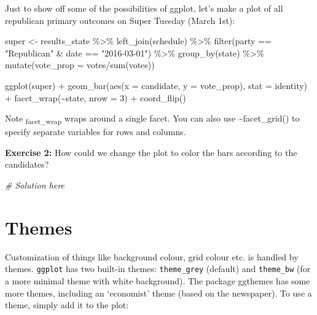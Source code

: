 \documentclass[
]{article}
\newenvironment{Shaded}{\begin{snugshade}}{\end{snugshade}}
\newcommand{\AttributeTok}[1]{\textcolor[rgb]{0.77,0.63,0.00}{#1}}
\newcommand{\CommentTok}[1]{\textcolor[rgb]{0.56,0.35,0.01}{\textit{#1}}}
\newcommand{\DecValTok}[1]{\textcolor[rgb]{0.00,0.00,0.81}{#1}}
\newcommand{\FunctionTok}[1]{\textcolor[rgb]{0.00,0.00,0.00}{#1}}
\newcommand{\NormalTok}[1]{#1}
\newcommand{\OtherTok}[1]{\textcolor[rgb]{0.56,0.35,0.01}{#1}}
\newcommand{\SpecialCharTok}[1]{\textcolor[rgb]{0.00,0.00,0.00}{#1}}
\newcommand{\StringTok}[1]{\textcolor[rgb]{0.31,0.60,0.02}{#1}}
\begin{document}
Just to show off some of the possibilities of ggplot, let's make a plot
of all republican primary outcomes on Super Tuesday (March 1st):

\begin{Shaded}
\begin{Highlighting}[]
\NormalTok{super }\OtherTok{\textless{}{-}}\NormalTok{ results\_state }\SpecialCharTok{\%\textgreater{}\%} 
  \FunctionTok{left\_join}\NormalTok{(schedule) }\SpecialCharTok{\%\textgreater{}\%} 
  \FunctionTok{filter}\NormalTok{(party }\SpecialCharTok{==} \StringTok{"Republican"} \SpecialCharTok{\&}\NormalTok{ date }\SpecialCharTok{==} \StringTok{"2016{-}03{-}01"}\NormalTok{) }\SpecialCharTok{\%\textgreater{}\%} 
  \FunctionTok{group\_by}\NormalTok{(state) }\SpecialCharTok{\%\textgreater{}\%} 
  \FunctionTok{mutate}\NormalTok{(}\AttributeTok{vote\_prop =}\NormalTok{ votes}\SpecialCharTok{/}\FunctionTok{sum}\NormalTok{(votes))}

\FunctionTok{ggplot}\NormalTok{(super) }\SpecialCharTok{+} 
  \FunctionTok{geom\_bar}\NormalTok{(}\FunctionTok{aes}\NormalTok{(}\AttributeTok{x =}\NormalTok{ candidate, }\AttributeTok{y =}\NormalTok{ vote\_prop), }
           \AttributeTok{stat =} \StringTok{\textquotesingle{}identity\textquotesingle{}}\NormalTok{) }\SpecialCharTok{+} 
  \FunctionTok{facet\_wrap}\NormalTok{(}\SpecialCharTok{\textasciitilde{}}\NormalTok{state, }\AttributeTok{nrow =} \DecValTok{3}\NormalTok{) }\SpecialCharTok{+} 
  \FunctionTok{coord\_flip}\NormalTok{()}
\end{Highlighting}
\end{Shaded}

Note \textsubscript{facet\_wrap} wraps around a single facet. You can
also use \textasciitilde facet\_grid() to specify separate variables for
rows and columns.

\textbf{Exercise 2:} How could we change the plot to color the bars
according to the candidates?

\begin{Shaded}
\begin{Highlighting}[]
\CommentTok{\# Solution here}
\end{Highlighting}
\end{Shaded}

\hypertarget{themes}{%
\section{Themes}\label{themes}}

Customization of things like background colour, grid colour etc. is
handled by themes. \texttt{ggplot} has two built-in themes:
\texttt{theme\_grey} (default) and \texttt{theme\_bw} (for a more
minimal theme with white background). The package ggthemes has some more
themes, including an `economist' theme (based on the newspaper). To use
a theme, simply add it to the plot:
\end{document}
